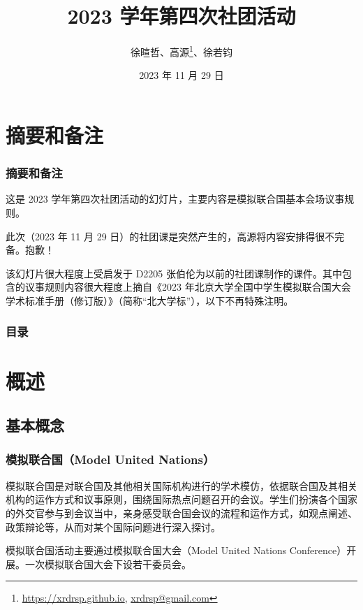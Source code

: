 \documentclass{beamer}
\title{2023 学年第四次社团活动}
\author{徐暄哲、高源\thanks{\href{https://xrdrsp.github.io}{https://xrdrsp.github.io}, \href{mailto:xrdrsp@gmail.com}{xrdrsp@gmail.com}}、徐若钧}
\institute{宁波效实中学（东部校区）模拟联合国社团}
\date{2023 年 11 月 29 日}
\begin{document}
\maketitle

\section{摘要和备注}

\begin{frame}
    \frametitle{摘要和备注}

    这是 2023 学年第四次社团活动的幻灯片，主要内容是模拟联合国基本会场议事规则。

    此次（2023 年 11 月 29 日）的社团课是突然产生的，高源将内容安排得很不完备。抱歉！

    该幻灯片很大程度上受启发于 D2205 张伯伦为以前的社团课制作的课件。其中包含的议事规则内容很大程度上摘自《2023 年北京大学全国中学生模拟联合国大会学术标准手册（修订版）》（简称“北大学标”），以下不再特殊注明。
\end{frame}

\begin{frame}
\frametitle{目录}
\begin{multicols}{2}
\tableofcontents
\end{multicols}
\end{frame}

\section{概述}

\subsection{基本概念}

\begin{frame}

\frametitle{模拟联合国（Model United Nations）}

模拟联合国是对联合国及其他相关国际机构进行的学术模仿，依据联合国及其相关机构的运作方式和议事原则，围绕国际热点问题召开的会议。学生们扮演各个国家的外交官参与到会议当中，亲身感受联合国会议的流程和运作方式，如观点阐述、政策辩论等，从而对某个国际问题进行深入探讨。


模拟联合国活动主要通过模拟联合国大会（Model United Nations Conference）开展。一次模拟联合国大会下设若干委员会。


\end{frame}
\end{document}

